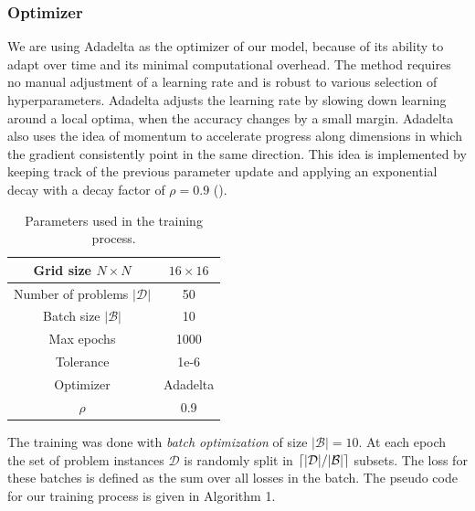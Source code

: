 \subsubsection{Optimizer}
We are using Adadelta as the optimizer of our model, because of its ability to adapt over time and its minimal computational overhead. The method requires no manual adjustment of a learning rate and is robust to various selection of hyperparameters. Adadelta adjusts the learning rate by slowing down learning around a local optima, when the accuracy changes by a small margin. Adadelta also uses the idea of momentum to accelerate progress along dimensions in which the gradient consistently point in the same direction. This idea is implemented by keeping track of the previous parameter update and applying an exponential decay with a decay factor of $\rho = 0.9$ (\cite{adadelta_ref}). \\

\begin{table}[h]
\centering
\caption{Parameters used in the training process.}
\begin{tabular}{| c | c |}
	  \hline
      Grid size $N\times N$  & $16\times 16$ \\
      \hline
      Number of problems $|\mathcal{D}|$  & 50 \\
      \hline
      Batch size $|\mathcal{B}|$ & 10  \\
      \hline
      Max epochs & 1000 \\
      \hline
      Tolerance &  1e-6  \\
      \hline
      Optimizer  & Adadelta   \\
      \hline
      $\rho$ & 0.9  \\
      \hline
\end{tabular}
\label{table:parameters}
\end{table}

The training was done with \textit{batch optimization} of size $|\mathcal{B}|=10$.
At each epoch the set of problem instances $\mathcal{D}$ is randomly split in $\lceil |\mathcal{D}|/|\mathcal{B}| \rceil$ subsets.
The loss for these batches is defined as the sum over all losses in the batch. The pseudo code for our training process is given in Algorithm 1.

